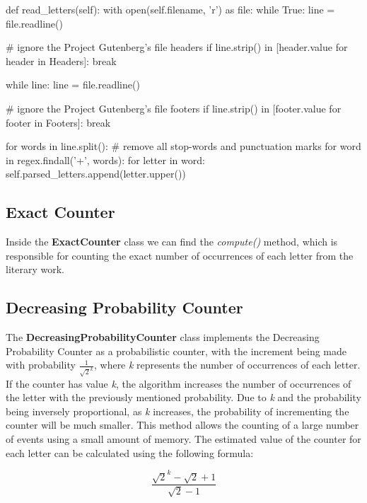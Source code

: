 \documentclass[...]{revdetua}
\begin{document}
\begin{python}[linenos, tabsize=1, breaklines]
def read_letters(self):
    with open(self.filename, 'r') as file:
        while True:
            line = file.readline()

            # ignore the Project Gutenberg's file headers
                if line.strip() in [header.value for header in Headers]: break
                
        while line:
            line = file.readline()

            # ignore the Project Gutenberg's file footers
            if line.strip() in [footer.value for footer in Footers]: break
            
            for words in line.split():
                # remove all stop-words and punctuation marks
                for word in regex.findall('+', words):
                    for letter in word:
                        self.parsed_letters.append(letter.upper())
\end{python}

\subsection{Exact Counter}

Inside the \textbf{ExactCounter} class we can find the \textit{compute()} method, which is responsible for counting the exact number of occurrences of each letter from the literary work.

\subsection{Decreasing Probability Counter}

The \textbf{DecreasingProbabilityCounter} class implements the Decreasing Probability Counter as a probabilistic counter, with the increment being made with probability \(\frac{1}{\sqrt{2}^k}\), where \textit{k} represents the number of occurrences of each letter. If the counter has value \textit{k}, the algorithm increases the number of occurrences of the letter with the previously mentioned probability. Due to \textit{k} and the probability being inversely proportional, as \textit{k} increases, the probability of incrementing the counter will be much smaller. This method allows the counting of a large number of events using a small amount of memory.
The estimated value of the counter
for each letter can be calculated using the following formula:

\[
\frac{\sqrt{2}^k - \sqrt{2} + 1}{\sqrt{2} - 1}
\]
\end{document}

